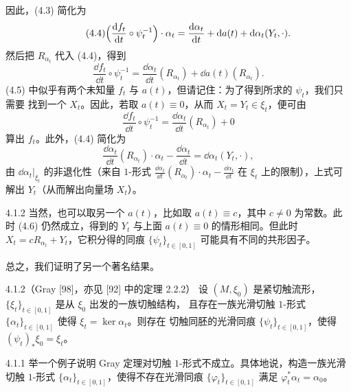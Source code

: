 因此，(4.3) 简化为
\begin{equation}\tag{4.4}
  \Bigl(\frac{\mathrm{d} f_t}{\mathrm{d} t}\circ\psi_t^{-1}\Bigr)\cdot\alpha_t
  =\frac{\mathrm{d}\alpha_t}{\mathrm{d} t}+\mathrm{d} a(t)+\mathrm{d}\alpha_t(Y_t,\cdot).
\end{equation}
然后把 $R_{\alpha_t}$ 代入 (4.4)，得到
\begin{equation}\tag{4.5}
  \frac{\dd f_t}{\dd t}\circ\psi_t^{-1}
  =\frac{\dd\alpha_t}{\dd t}(R_{\alpha_t})+\dd a(t)(R_{\alpha_t}).
\end{equation}
(4.5) 中似乎有两个未知量 $f_t$ 与 $a(t)$，但请记住：为了得到所求的 $\psi_t$，我们只需要
找到一个 $X_t$。因此，若取 $a(t)\equiv0$，从而 $X_t=Y_t\in\xi_t$，便可由
\begin{equation*}
  \frac{\dd f_t}{\dd t}\circ\psi_t^{-1}
  =\frac{\dd\alpha_t}{\dd t}(R_{\alpha_t})+0
\end{equation*}
算出 $f_t$。此外，(4.4) 简化为
\begin{equation}\tag{4.6}
  \frac{\dd\alpha_t}{\dd t}(R_{\alpha_t})\cdot\alpha_t
  -\frac{\dd\alpha_t}{\dd t}=\dd\alpha_t(Y_t,\cdot),
\end{equation}
由 $\dd\alpha_t|_{\xi_t}$ 的非退化性（来自 $1$-形式
$\frac{\dd\alpha_t}{\dd t}(R_{\alpha_t})\cdot\alpha_t-\frac{\dd\alpha_t}{\dd t}$
在 $\xi_t$ 上的限制），上式可解出 $Y_t$（从而解出向量场 $X_t$）。

\begin{wrem}{4.1.2}
  当然，也可以取另一个 $a(t)$，比如取 $a(t)\equiv c$，其中 $c\neq0$ 为常数。此时 (4.6)
  仍然成立，得到的 $Y_t$ 与上面 $a(t)\equiv0$ 的情形相同。但此时
  $X_t=cR_{\alpha_t}+Y_t$，它积分得的同痕 $\{\psi_t\}_{t\in[0,1]}$ 可能具有不同的共形因子。
\end{wrem}

总之，我们证明了另一个著名结果。

\begin{wthm}{4.1.2}（Gray [98]，亦见 [92] 中的定理 2.2.2）
  设 $(M,\xi_0)$ 是紧切触流形，$\{\xi_t\}_{t\in[0,1]}$ 是从 $\xi_0$ 出发的一族切触结构，
  且存在一族光滑切触 $1$-形式 $\{\alpha_t\}_{t\in[0,1]}$ 使得 $\xi_t=\ker\alpha_t$。则存在
  切触同胚的光滑同痕 $\{\psi_t\}_{t\in[0,1]}$，使得 $(\psi_t)_*\xi_0=\xi_t$。
\end{wthm}

\begin{wexer}{4.1.1}
  举一个例子说明 Gray 定理对切触 $1$-形式不成立。具体地说，构造一族光滑切触 $1$-形式
  $\{\alpha_t\}_{t\in[0,1]}$，使得不存在光滑同痕 $\{\varphi_t\}_{t\in[0,1]}$ 满足
  $\varphi_t^*\alpha_t=\alpha_0$。
\end{wexer}
